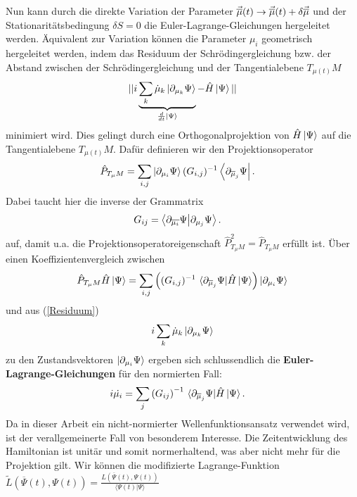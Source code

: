Nun kann durch die direkte Variation der Parameter $\vec{\overline{\mu}}(t)\rightarrow \vec{\overline{\mu}}(t) + \delta\vec{\overline{\mu}}$ und der Stationaritätsbedingung 
$\delta S = 0$ die Euler-Lagrange-Gleichungen hergeleitet werden. Äquivalent zur Variation können die Parameter $\mu_i$ geometrisch hergeleitet
werden, indem das Residuum der Schrödingergleichung bzw. der Abstand zwischen der Schrödingergleichung und der Tangentialebene $T_{\mu(t)}M$ 
\begin{align}\label{Residuum}
    || i\underbrace{\sum_k \dot{\mu}_k\ket{\partial_{\mu_k}\Psi}}_{\frac{d}{dt}\ket{\Psi}} - \hat{H}\ket{\Psi} || 
\end{align}
minimiert wird. Dies gelingt durch eine Orthogonalprojektion von $\hat{H}\ket{\Psi}$ auf die Tangentialebene $T_{\mu(t)}M$. Dafür definieren wir den 
Projektionsoperator
\begin{align}
    \hat{P}_{T_{\mu}M} &= \sum_{i,j}\ket{\partial_{\mu_i}\Psi}(G_{i,j})^{-1}\bra{\partial_{\overline{\mu}_j}\Psi}.
\end{align}
Dabei taucht hier die inverse der Grammatrix 
\begin{align}
    G_{ij} &= \bra{\partial_{\overline{\mu_i}}\Psi}\ket{\partial_{\mu_j}\Psi}. 
\end{align}
auf, damit u.a. die Projektionsoperatoreigenschaft $\hat{P}_{T_{\mu}M}^2=\hat{P}_{T_{\mu}M}$ 
erfüllt ist. Über einen Koeffizientenvergleich zwischen
\begin{align}
    \hat{P}_{T_{\mu}M}\hat{H}\ket{\Psi} = \sum_{i,j}\left((G_{i,j})^{-1}\ 
    \langle\partial_{\muk_j}\Psi|\hat{H}\ket{\Psi}\right)\ket{\partial_{\mu_i}\Psi}
\end{align} 
und aus (\ref{Residuum})
\begin{align}
    i\sum_k \dot{\mu}_k\ket{\partial_{\mu_k}\Psi}
\end{align}
zu den Zustandsvektoren $\ket{\partial_{\mu_i}\Psi}$ ergeben sich schlussendlich die \textbf{Euler-Lagrange-Gleichungen} für den normierten Fall:
\begin{align}
    i\dot{\mu_i} &= \sum_{j}\left(G_{ij}\right)^{-1}\thinspace \langle\partial_{\overline{\mu}_j}\Psi|\hat{H}\ket{\Psi}.
\end{align}
Da in dieser Arbeit ein nicht-normierter Wellenfunktionsansatz verwendet wird, ist der verallgemeinerte Fall von besonderem Interesse. Die Zeitentwicklung
des Hamiltonian ist unitär und somit normerhaltend, was aber nicht mehr für die Projektion gilt. Wir
können die modifizierte Lagrange-Funktion $\widetilde{L}(\overline{\Psi}(t), \Psi(t)) = \frac{L(\overline{\Psi}(t), \Psi(t))}{\langle \Psi(t)|\Psi\rangle}$
